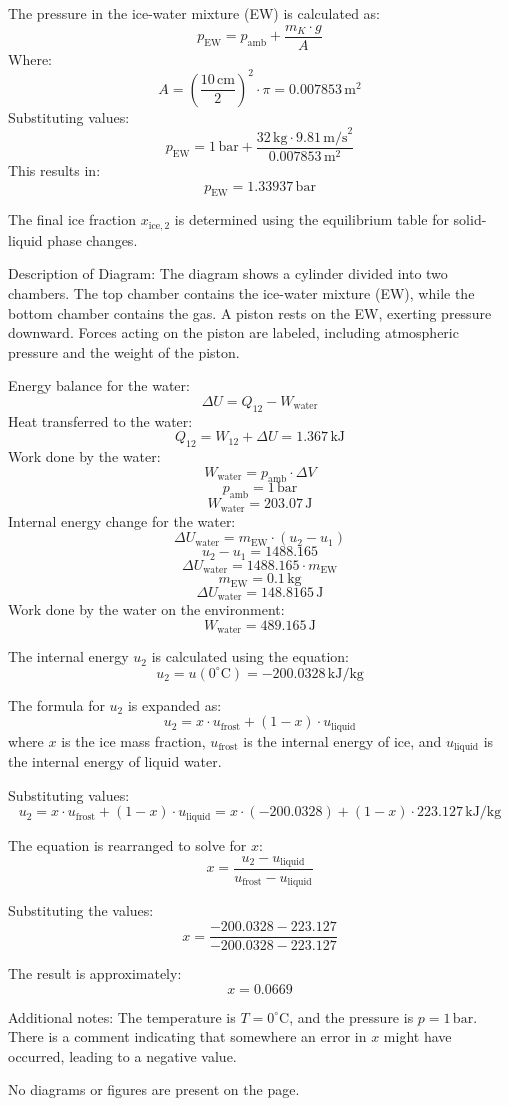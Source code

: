 The pressure in the ice-water mixture (EW) is calculated as:  
\[
p_{\text{EW}} = p_{\text{amb}} + \frac{m_K \cdot g}{A}
\]  
Where:  
\[
A = \left( \frac{10 \, \text{cm}}{2} \right)^2 \cdot \pi = 0.007853 \, \text{m}^2
\]  
Substituting values:  
\[
p_{\text{EW}} = 1 \, \text{bar} + \frac{32 \, \text{kg} \cdot 9.81 \, \text{m/s}^2}{0.007853 \, \text{m}^2}
\]  
This results in:  
\[
p_{\text{EW}} = 1.33937 \, \text{bar}
\]  

The final ice fraction \( x_{\text{ice},2} \) is determined using the equilibrium table for solid-liquid phase changes.  

Description of Diagram:  
The diagram shows a cylinder divided into two chambers. The top chamber contains the ice-water mixture (EW), while the bottom chamber contains the gas. A piston rests on the EW, exerting pressure downward. Forces acting on the piston are labeled, including atmospheric pressure and the weight of the piston.

Energy balance for the water:  
\[
\Delta U = Q_{12} - W_{\text{water}}
\]  
Heat transferred to the water:  
\[
Q_{12} = W_{12} + \Delta U = 1.367 \, \text{kJ}
\]  
Work done by the water:  
\[
W_{\text{water}} = p_{\text{amb}} \cdot \Delta V
\]  
\[
p_{\text{amb}} = 1 \, \text{bar}
\]  
\[
W_{\text{water}} = 203.07 \, \text{J}
\]  
Internal energy change for the water:  
\[
\Delta U_{\text{water}} = m_{\text{EW}} \cdot (u_2 - u_1)
\]  
\[
u_2 - u_1 = 1488.165
\]  
\[
\Delta U_{\text{water}} = 1488.165 \cdot m_{\text{EW}}
\]  
\[
m_{\text{EW}} = 0.1 \, \text{kg}
\]  
\[
\Delta U_{\text{water}} = 148.8165 \, \text{J}
\]  
Work done by the water on the environment:  
\[
W_{\text{water}} = 489.165 \, \text{J}
\]

The internal energy \( u_2 \) is calculated using the equation:  
\[
u_2 = u(0^\circ\text{C}) = -200.0328 \, \text{kJ/kg}
\]  

The formula for \( u_2 \) is expanded as:  
\[
u_2 = x \cdot u_{\text{frost}} + (1 - x) \cdot u_{\text{liquid}}
\]  
where \( x \) is the ice mass fraction, \( u_{\text{frost}} \) is the internal energy of ice, and \( u_{\text{liquid}} \) is the internal energy of liquid water.  

Substituting values:  
\[
u_2 = x \cdot u_{\text{frost}} + (1 - x) \cdot u_{\text{liquid}} = x \cdot (-200.0328) + (1 - x) \cdot 223.127 \, \text{kJ/kg}
\]  

The equation is rearranged to solve for \( x \):  
\[
x = \frac{u_2 - u_{\text{liquid}}}{u_{\text{frost}} - u_{\text{liquid}}}
\]  

Substituting the values:  
\[
x = \frac{-200.0328 - 223.127}{-200.0328 - 223.127}
\]  

The result is approximately:  
\[
x = 0.0669
\]  

Additional notes:  
The temperature is \( T = 0^\circ\text{C} \), and the pressure is \( p = 1 \, \text{bar} \). There is a comment indicating that somewhere an error in \( x \) might have occurred, leading to a negative value.  

No diagrams or figures are present on the page.